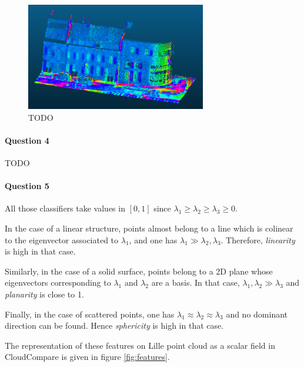 \documentclass[10pt,a4paper]{article}
\begin{document}
\begin{figure}[h!]
	\centering
	\includegraphics[width=0.7\textwidth]{lille_normals.png}
	\caption{TODO}
	\label{fig:normals}
\end{figure}

\paragraph{Question 4}

TODO

\paragraph{Question 5} %

All those classifiers take values in $[0,1]$ since $\lambda_1 \geq \lambda_2 \geq \lambda_3 \geq 0$.

In the case of a linear structure,  points almost belong to a line which is colinear to the eigenvector associated to $\lambda_1$, and one has $\lambda_1 \gg \lambda_2, \lambda_3$. Therefore, \emph{linearity} is high in that case.

Similarly, in the case of a solid surface, points belong to a 2D plane whose eigenvectors corresponding to $\lambda_1$ and $\lambda_2$ are a basis. In that case, $\lambda_1, \lambda_2 \gg \lambda_3$ and \emph{planarity} is close to 1.

Finally, in the case of scattered points, one has $\lambda_1 \approx \lambda_2 \approx \lambda_3$ and no dominant direction can be found. Hence \emph{sphericity} is high in that case.

The representation of these features on Lille point cloud as a scalar field in CloudCompare is given in figure \ref{fig:features}.
\end{document}
